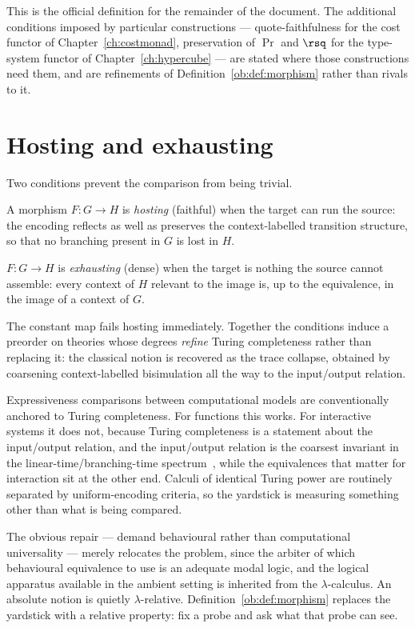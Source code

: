 This is the official definition for the remainder of the document. The additional
conditions imposed by particular constructions --- quote-faithfulness for the cost
functor of Chapter~\ref{ch:costmonad}, preservation of $\Pr$ and $\rsq$ for the type-system
functor of Chapter~\ref{ch:hypercube} --- are stated where those constructions need
them, and are refinements of Definition~\ref{ob:def:morphism} rather than rivals to it.

\section{Hosting and exhausting}

Two conditions prevent the comparison from being trivial.

\begin{definition}[Hosting]
A morphism $F : G \to H$ is \emph{hosting} (faithful) when the target can run the
source: the encoding reflects as well as preserves the context-labelled transition
structure, so that no branching present in $G$ is lost in $H$.
\end{definition}

\begin{definition}[Exhausting]
$F : G \to H$ is \emph{exhausting} (dense) when the target is nothing the source cannot
assemble: every context of $H$ relevant to the image is, up to the equivalence, in the
image of a context of $G$.
\end{definition}

The constant map fails hosting immediately. Together the conditions induce a preorder on
theories whose degrees \emph{refine} Turing completeness rather than replacing it: the
classical notion is recovered as the trace collapse, obtained by coarsening
context-labelled bisimulation all the way to the input/output relation.

\begin{remark}
Expressiveness comparisons between computational models are conventionally anchored to
Turing completeness. For functions this works. For interactive systems it does not,
because Turing completeness is a statement about the input/output relation, and the
input/output relation is the coarsest invariant in the linear-time/branching-time
spectrum~\cite{vanGlabbeek1990}, while the equivalences that matter for interaction sit
at the other end. Calculi of identical Turing power are routinely separated by
uniform-encoding criteria, so the yardstick is measuring something other than what is
being compared.

The obvious repair --- demand behavioural rather than computational universality ---
merely relocates the problem, since the arbiter of which behavioural equivalence to use
is an adequate modal logic, and the logical apparatus available in the ambient setting is
inherited from the $\lambda$-calculus. An absolute notion is quietly $\lambda$-relative.
Definition~\ref{ob:def:morphism} replaces the yardstick with a relative property: fix a
probe and ask what that probe can see.
\end{remark}

